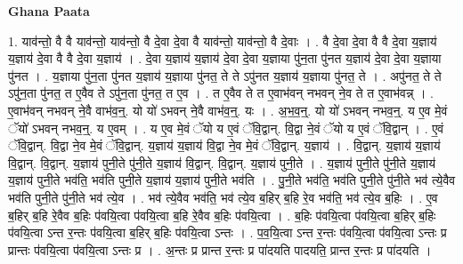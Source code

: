 \documentclass[17pt]{extarticle}
\begin{document}
\textbf{Ghana Paata } \newline

1. याव॑न्तो॒ वै वै याव॑न्तो॒ याव॑न्तो॒ वै दे॒वा दे॒वा वै याव॑न्तो॒ याव॑न्तो॒ वै दे॒वाः । . वै दे॒वा दे॒वा वै वै दे॒वा य॒ज्ञाय॑ य॒ज्ञाय॑ दे॒वा वै वै दे॒वा य॒ज्ञाय॑ । . दे॒वा य॒ज्ञाय॑ य॒ज्ञाय॑ दे॒वा दे॒वा य॒ज्ञाया पु॑न॒ता पु॑नत य॒ज्ञाय॑ दे॒वा दे॒वा य॒ज्ञाया पु॑नत । . य॒ज्ञाया पु॑न॒ता पु॑नत य॒ज्ञाय॑ य॒ज्ञाया पु॑नत॒ ते ते ऽपु॑नत य॒ज्ञाय॑ य॒ज्ञाया पु॑नत॒ ते । . अपु॑नत॒ ते ते ऽपु॑न॒ता पु॑नत॒ त ए॒वैव ते ऽपु॑न॒ता पु॑नत॒ त ए॒व । . त ए॒वैव ते त ए॒वाभ॑वन् नभवन् ने॒व ते त ए॒वाभ॑वन्न् । . ए॒वाभ॑वन् नभवन् ने॒वै वाभ॑व॒न्॒. यो यो॑ ऽभवन् ने॒वै वाभ॑व॒न्॒. यः । . अ॒भ॒व॒न्॒. यो यो॑ ऽभवन् नभव॒न्॒. य ए॒व मे॒वं ॅयो॑ ऽभवन् नभव॒न्॒. य ए॒वम् । . य ए॒व मे॒वं ॅयो य ए॒वं ॅवि॒द्वान्. वि॒द्वा ने॒वं ॅयो य ए॒वं ॅवि॒द्वान् । . ए॒वं ॅवि॒द्वान्. वि॒द्वा ने॒व मे॒वं ॅवि॒द्वान्. य॒ज्ञाय॑ य॒ज्ञाय॑ वि॒द्वा ने॒व मे॒वं ॅवि॒द्वान्. य॒ज्ञाय॑ । . वि॒द्वान्. य॒ज्ञाय॑ य॒ज्ञाय॑ वि॒द्वान्. वि॒द्वान्. य॒ज्ञाय॑ पुनी॒ते पु॑नी॒ते य॒ज्ञाय॑ वि॒द्वान्. वि॒द्वान्. य॒ज्ञाय॑ पुनी॒ते । . य॒ज्ञाय॑ पुनी॒ते पु॑नी॒ते य॒ज्ञाय॑ य॒ज्ञाय॑ पुनी॒ते भव॑ति॒ भव॑ति पुनी॒ते य॒ज्ञाय॑ य॒ज्ञाय॑ पुनी॒ते भव॑ति । . पु॒नी॒ते भव॑ति॒ भव॑ति पुनी॒ते पु॑नी॒ते भव॑ त्ये॒वैव भव॑ति पुनी॒ते पु॑नी॒ते भव॑ त्ये॒व । . भव॑ त्ये॒वैव भव॑ति॒ भव॑ त्ये॒व ब॒हिर् ब॒हि रे॒व भव॑ति॒ भव॑ त्ये॒व ब॒हिः । . ए॒व ब॒हिर् ब॒हि रे॒वैव ब॒हिः प॑वयि॒त्वा प॑वयि॒त्वा ब॒हि रे॒वैव ब॒हिः प॑वयि॒त्वा । . ब॒हिः प॑वयि॒त्वा प॑वयि॒त्वा ब॒हिर् ब॒हिः प॑वयि॒त्वा ऽन्त र॒न्तः प॑वयि॒त्वा ब॒हिर् ब॒हिः प॑वयि॒त्वा ऽन्तः । . प॒व॒यि॒त्वा ऽन्त र॒न्तः प॑वयि॒त्वा प॑वयि॒त्वा ऽन्तः प्र प्रान्तः प॑वयि॒त्वा प॑वयि॒त्वा ऽन्तः प्र । . अ॒न्तः प्र प्रान्त र॒न्तः प्र पा॑दयति पादयति॒ प्रान्त र॒न्तः प्र पा॑दयति । \newline
\end{document}
